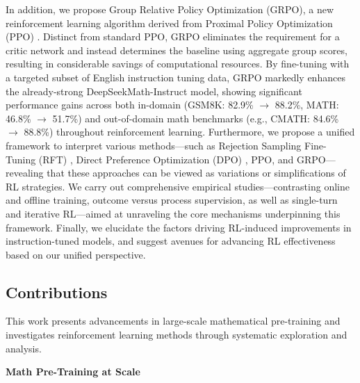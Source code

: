 In addition, we propose Group Relative Policy Optimization (GRPO), a new reinforcement learning algorithm derived from Proximal Policy Optimization (PPO) \citep{schulman2017proximal}. Distinct from standard PPO, GRPO eliminates the requirement for a critic network and instead determines the baseline using aggregate group scores, resulting in considerable savings of computational resources. By fine-tuning with a targeted subset of English instruction tuning data, GRPO markedly enhances the already-strong DeepSeekMath-Instruct model, showing significant performance gains across both in-domain (GSM8K: 82.9\% $\rightarrow$ 88.2\%, MATH: 46.8\% $\rightarrow$ 51.7\%) and out-of-domain math benchmarks (e.g., CMATH: 84.6\% $\rightarrow$ 88.8\%) throughout reinforcement learning. Furthermore, we propose a unified framework to interpret various methods—such as Rejection Sampling Fine-Tuning (RFT) \citep{yuan2023scaling}, Direct Preference Optimization (DPO) \citep{dpo}, PPO, and GRPO—revealing that these approaches can be viewed as variations or simplifications of RL strategies. We carry out comprehensive empirical studies—contrasting online and offline training, outcome versus process supervision, as well as single-turn and iterative RL—aimed at unraveling the core mechanisms underpinning this framework. Finally, we elucidate the factors driving RL-induced improvements in instruction-tuned models, and suggest avenues for advancing RL effectiveness based on our unified perspective.

\subsection{Contributions}

This work presents advancements in large-scale mathematical pre-training and investigates reinforcement learning methods through systematic exploration and analysis.

\textbf{Math Pre-Training at Scale}

